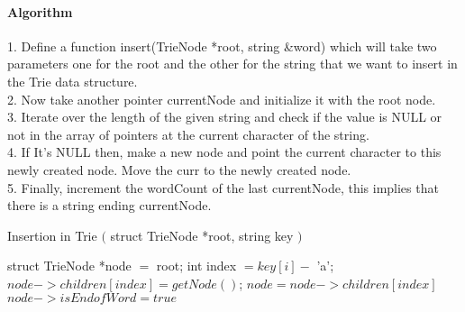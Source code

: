 \documentclass[11pt,a4paper]{article}
\begin{document}
\paragraph{Algorithm}
1. Define a function insert(TrieNode *root, string &word) which will take two parameters one for the root and the other for the string that we want to insert in the Trie data structure.
\\
2. Now take another pointer currentNode and initialize it with the root node.
\\
3. Iterate over the length of the given string and check if the value is NULL or not in the array of pointers at the current character of the string.
\\
4. If It’s NULL then, make a new node and point the current character to this newly created node. Move the curr to the newly created node.
\\
5. Finally, increment the wordCount of the last currentNode, this implies that there is a string ending currentNode.
\\
\begin{algorithm}[H]
\caption*{Insertion in Trie \begin{math} ( \end{math} struct TrieNode *root, string key \begin{math} ) \end{math} }
\label{InsertionTriepsuedocode}
\begin{algorithmic}
\STATE struct TrieNode *node \begin{math} = \end{math} root;
\STATE int index \begin{math}= key[i] - \end{math} 'a';
\STATE \hspace{0.5cm} \begin{math} node->children[index] = getNode() \end{math};
\ENDIF
\STATE \begin{math} node = node->children[index] \end{math}
\ENDFOR
\\
\begin{math} node->isEndofWord = true \end{math}
\end{algorithmic}
\end{algorithm}
\end{document}
